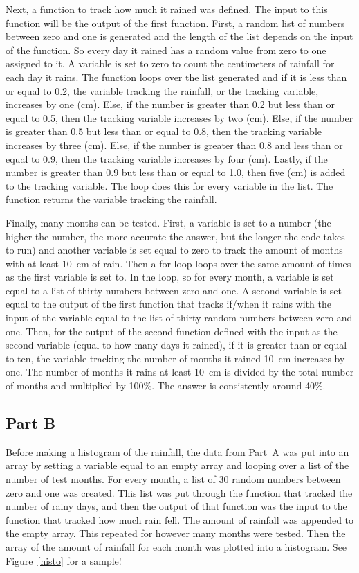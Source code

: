 \documentclass[twocolumn]{revtex4}
\begin{document}
	
	Next, a function to track how much it rained was defined. The input to this function will 
	be the output of the first function. First, a random list of numbers between zero and
	one is generated and the length of the list depends on the input of the function. So 
	every day it rained has a random value from zero to one assigned to it. A 
	variable is set to zero to count the centimeters of rainfall for each day it rains. The 
	function loops over the list generated and if it is less than or equal to 0.2, the variable 
	tracking the rainfall, or the tracking variable, increases by one (cm). Else, if the number 
	is greater than 0.2 but less than or equal to 0.5, then the tracking variable increases by 
	two (cm). Else, if the number is greater than 0.5 but less than or equal to 0.8, then the 
	tracking variable increases by three (cm). Else, if the number is greater than 0.8 and 
	less than or equal to 0.9, then the tracking variable increases by four (cm). Lastly, if the 
	number is greater than 0.9 but less than or equal to 1.0, then five (cm) is added to the 
	tracking variable. The loop does this for every variable in the list. The function returns 
	the variable tracking the rainfall.
	
	Finally, many months can be tested. First, a variable is set to a number (the higher the 
	number, the more accurate the answer, but the longer the code takes to run) and 
	another variable is set equal to zero to track the amount of months with at least 10~cm 
	of rain. Then a for loop loops over the same amount of times as the first variable is set
	to. In the loop, so for every month, a variable is set equal to a list of thirty numbers 
	between zero and one. A second variable is set equal to the output of the first function
	that tracks if/when it rains with the input of the variable equal to the list of thirty random 
	numbers between zero and one. Then, for the output of the second function defined 
	with the input as the second variable (equal to how many days it rained), if it is greater 
	than or equal to ten, the variable tracking the number of months it rained 10~cm 
	increases by one. The number of months it rains at least 10~cm is divided by the total 
	number of months and multiplied by 100\%.  The answer is consistently around 40\%.
	

\subsection{Part B}

	Before making a histogram of the rainfall, the data from Part~A was put into an array by
	setting a variable equal to an empty array and looping over a list of the number of 
	test months. For every month, a list of 30 random numbers between zero and one was 
	created. This list was put through the function that tracked the number of rainy days,
	and then the output of that function was the input to the function that tracked how much 
	rain fell. The amount of rainfall was appended to the empty array. This repeated for 
	however many months were tested. Then the array of the amount of rainfall for each 
	month was plotted into a histogram. See Figure~\ref{histo} for a sample!
	
\end{document}
